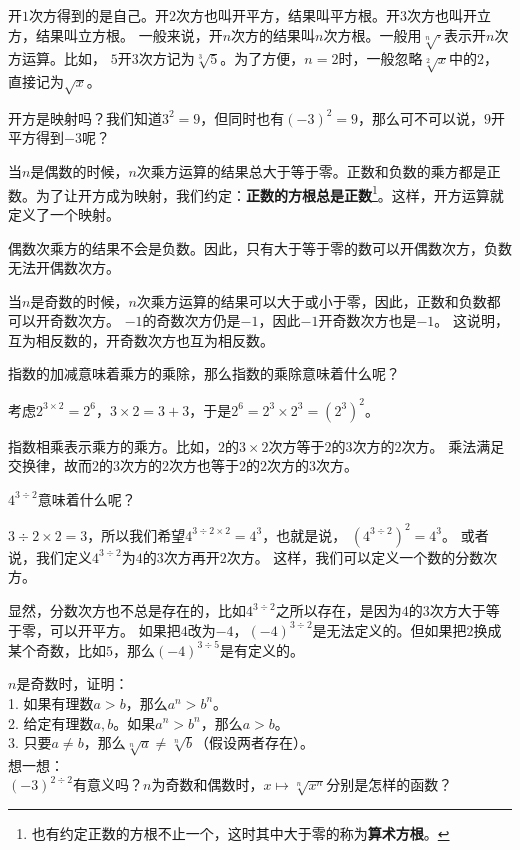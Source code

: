 \documentclass[12pt,UTF8,fontset=none]{ctexbook}
\begin{document}
开$1$次方得到的是自己。开$2$次方也叫开平方，结果叫平方根。开$3$次方也叫开立方，结果叫立方根。
一般来说，开$n$次方的结果叫$n$次方根。一般用$\sqrt[n]{\cdot}$表示开$n$次方运算。比如，
$5$开$3$次方记为$\sqrt[3]{5}$。为了方便，$n=2$时，一般忽略$\sqrt[2]{x}$中的$2$，直接记为$\sqrt{x}$。

开方是映射吗？我们知道$3^2 =9$，但同时也有$(-3)^2 =9$，那么可不可以说，$9$开平方得到$-3$呢？

当$n$是偶数的时候，$n$次乘方运算的结果总大于等于零。正数和负数的乘方都是正数。为了让开方成为映射，我们约定：\textbf{正数的方根总是正数}\footnote{也有约定正数的方根不止一个，这时其中大于零的称为\textbf{算术方根}。}。这样，开方运算就定义了一个映射。

偶数次乘方的结果不会是负数。因此，只有大于等于零的数可以开偶数次方，负数无法开偶数次方。

当$n$是奇数的时候，$n$次乘方运算的结果可以大于或小于零，因此，正数和负数都可以开奇数次方。
$-1$的奇数次方仍是$-1$，因此$-1$开奇数次方也是$-1$。
这说明，互为相反数的，开奇数次方也互为相反数。

指数的加减意味着乘方的乘除，那么指数的乘除意味着什么呢？

考虑$2^{3\times 2} = 2^6$，$3\times 2 = 3 + 3$，于是$2^6 = 2^3 \times 2^3 = \left(2^3\right)^2$。

指数相乘表示乘方的乘方。比如，$2$的$3\times 2$次方等于$2$的$3$次方的$2$次方。
乘法满足交换律，故而$2$的$3$次方的$2$次方也等于$2$的$2$次方的$3$次方。

$4^{3\div 2}$意味着什么呢？

$3\div 2 \times 2 = 3$，所以我们希望$4^{3\div 2 \times 2} = 4^3$，也就是说，
$\left(4^{3\div 2}\right)^2 = 4^3$。
或者说，我们定义$4^{3\div 2}$为$4$的$3$次方再开$2$次方。
这样，我们可以定义一个数的分数次方。

显然，分数次方也不总是存在的，比如$4^{3\div 2}$之所以存在，是因为$4$的$3$次方大于等于零，可以开平方。
如果把$4$改为$-4$，$(-4)^{3\div 2}$是无法定义的。但如果把$2$换成某个奇数，比如$5$，那么$(-4)^{3\div 5}$是有定义的。

\begin{sk}\label{sk:3-0-0}
    $n$是奇数时，证明：\\
    1. 如果有理数$a > b$，那么$a^n > b^n$。\\
    2. 给定有理数$a, b$。如果$a^n > b^n$，那么$a > b$。\\
    3. 只要$a \neq b$，那么$\sqrt[n]{a} \neq \sqrt[n]{b}$（假设两者存在）。\\
    想一想：\\
    $(-3)^{2\div 2}$有意义吗？$n$为奇数和偶数时，$x \mapsto \sqrt[n]{x^n}$分别是怎样的函数？
\end{sk}
\end{document}
